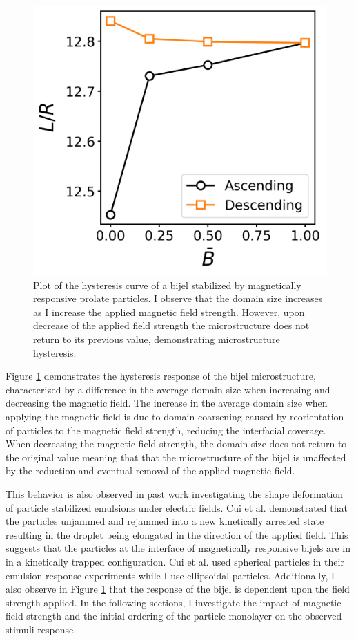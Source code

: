 \begin{figure} 
    \centering 
    \includegraphics[scale=0.5]{../figures/results/paper2/hysteresis_curve.png} 
    \caption{Plot of the hysteresis curve of a bijel stabilized by magnetically responsive prolate particles. I observe that the domain size increases as I 
    increase the applied magnetic field strength. However, upon decrease of the applied field strength the microstructure does not return to its previous value,
    demonstrating microstructure hysteresis.} 
    \label{fig:hysteresis_curve} 
\end{figure}

Figure \ref{fig:hysteresis_curve} demonstrates the hysteresis response of the bijel microstructure, characterized by a difference in the average domain size
when increasing and decreasing the magnetic field. The increase in the average domain size when applying the magnetic field is due to domain coarsening caused by 
reorientation of particles to the magnetic field strength, reducing the interfacial coverage. When decreasing the magnetic field strength, 
the domain size does not return to the original value meaning that that the microstructure of the bijel is unaffected by 
the reduction and eventual removal of the applied magnetic field. 

This behavior is also observed in past work investigating the shape deformation of particle stabilized emulsions under 
electric fields. \cite{cui_stabilizing_2013} Cui et al. demonstrated that the particles unjammed and rejammed into a new kinetically arrested state resulting in
the droplet being elongated in the direction of the applied field. This suggests that the particles at the interface of magnetically responsive bijels are in
in a kinetically trapped configuration. Cui et al. used spherical particles in their emulsion response experiments while I use ellipsoidal particles. Additionally,
I also observe in Figure \ref{fig:hysteresis_curve} that the response of the bijel is dependent upon the field strength applied.
In the following sections, I investigate the impact of magnetic field strength and the initial ordering of the particle monolayer on the observed stimuli response.

